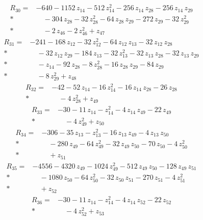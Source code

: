\documentclass[10pt]{article}
\begin{document}
\begin{align*}
R_{30}={}& - 640 - 1152\,z_{14} - 512\,z_{14}^{2} - 256\,z_{14}\,z_{28} - 256\,z_{14}\,z_{29} \\*
&\quad - 304\,z_{28} - 32\,z_{28}^{2} - 64\,z_{28}\,z_{29} - 272\,z_{29} - 32\,z_{29}^{2} \\*
&\quad - 2\,z_{46} - 2\,z_{46}^{2} + z_{47}
\end{align*}
\begin{align*}
R_{31}={}& - 241 - 168\,z_{12} - 32\,z_{12}^{2} - 64\,z_{12}\,z_{13} - 32\,z_{12}\,z_{28} \\*
&\quad - 32\,z_{12}\,z_{29} - 184\,z_{13} - 32\,z_{13}^{2} - 32\,z_{13}\,z_{28} - 32\,z_{13}\,z_{29} \\*
&\quad - z_{14} - 92\,z_{28} - 8\,z_{28}^{2} - 16\,z_{28}\,z_{29} - 84\,z_{29} \\*
&\quad - 8\,z_{29}^{2} + z_{48}
\end{align*}
\begin{align*}
R_{32}={}& - 42 - 52\,z_{14} - 16\,z_{14}^{2} - 16\,z_{14}\,z_{28} - 26\,z_{28} \\*
&\quad - 4\,z_{28}^{2} + z_{49}
\end{align*}
\begin{align*}
R_{33}={}& - 30 - 11\,z_{14} - z_{14}^{2} - 4\,z_{14}\,z_{49} - 22\,z_{49} \\*
&\quad - 4\,z_{49}^{2} + z_{50}
\end{align*}
\begin{align*}
R_{34}={}& - 306 - 35\,z_{13} - z_{13}^{2} - 16\,z_{13}\,z_{49} - 4\,z_{13}\,z_{50} \\*
&\quad - 280\,z_{49} - 64\,z_{49}^{2} - 32\,z_{49}\,z_{50} - 70\,z_{50} - 4\,z_{50}^{2} \\*
&\quad + z_{51}
\end{align*}
\begin{align*}
R_{35}={}& - 4556 - 4320\,z_{49} - 1024\,z_{49}^{2} - 512\,z_{49}\,z_{50} - 128\,z_{49}\,z_{51} \\*
&\quad - 1080\,z_{50} - 64\,z_{50}^{2} - 32\,z_{50}\,z_{51} - 270\,z_{51} - 4\,z_{51}^{2} \\*
&\quad + z_{52}
\end{align*}
\begin{align*}
R_{36}={}& - 30 - 11\,z_{14} - z_{14}^{2} - 4\,z_{14}\,z_{52} - 22\,z_{52} \\*
&\quad - 4\,z_{52}^{2} + z_{53}
\end{align*}
\end{document}
